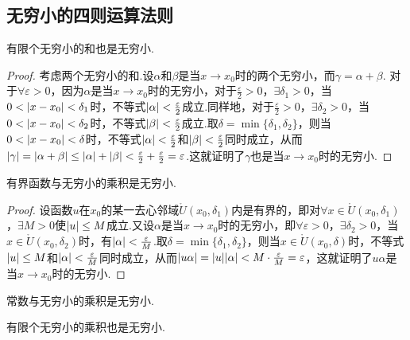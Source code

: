 \subsection{无穷小的四则运算法则}
\begin{theorem}
有限个无穷小的和也是无穷小.
\begin{proof}
考虑两个无穷小的和.设\(\alpha\)和\(\beta\)是当\(x \to x_0\)时的两个无穷小，而\(\gamma = \alpha+\beta\).
对于\(\forall\varepsilon>0\)，因为\(\alpha\)是当\(x \to x_0\)时的无穷小，对于\(\frac{\varepsilon}{2}>0\)，\(\exists \delta_1 > 0\)，当\(0<\abs{x-x_0}<\delta_1\)时，不等式\(\abs{\alpha}<\frac{\varepsilon}{2}\)成立.同样地，对于\(\frac{\varepsilon}{2}>0\)，\(\exists \delta_2 > 0\)，当\(0<\abs{x-x_0}<\delta_2\)时，不等式\(\abs{\beta}<\frac{\varepsilon}{2}\)成立.取\(\delta=\min\{\delta_1,\delta_2\}\)，则当\(0<\abs{x-x_0}<\delta\)时，不等式\(\abs{\alpha}<\frac{\varepsilon}{2}\)和\(\abs{\beta}<\frac{\varepsilon}{2}\)同时成立，从而\(\abs{\gamma}=\abs{\alpha+\beta}\leq\abs{\alpha}+\abs{\beta}<\frac{\varepsilon}{2}+\frac{\varepsilon}{2}=\varepsilon\).这就证明了\(\gamma\)也是当\(x \to x_0\)时的无穷小.
\end{proof}
\end{theorem}

\begin{theorem}
有界函数与无穷小的乘积是无穷小.
\begin{proof}
设函数\(u\)在\(x_0\)的某一去心邻域\(\mathring{U}(x_0,\delta_1)\)内是有界的，即对\(\forall x\in\mathring{U}(x_0,\delta_1)\)，\(\exists M>0\)使\(\abs{u} \leq M\)成立.又设\(\alpha\)是当\(x \to x_0\)时的无穷小，即\(\forall \varepsilon > 0\)，\(\exists \delta_2 > 0\)，当\(x\in\mathring{U}(x_0,\delta_2)\)时，有\(\abs{\alpha}<\frac{\varepsilon}{M}\).取\(\delta=\min\{\delta_1,\delta_2\}\)，则当\(x\in\mathring{U}(x_0,\delta)\)时，不等式\(\abs{u} \leq M\)和\(\abs{\alpha} < \frac{\varepsilon}{M}\)同时成立，从而\(\abs{u \alpha} = \abs{u}\abs{\alpha} < M \cdot \frac{\varepsilon}{M} = \varepsilon\)，这就证明了\(u \alpha\)是当\(x \to x_0\)时的无穷小.
\end{proof}
\end{theorem}

\begin{corollary}
常数与无穷小的乘积是无穷小.
\end{corollary}

\begin{corollary}
有限个无穷小的乘积也是无穷小.
\end{corollary}

